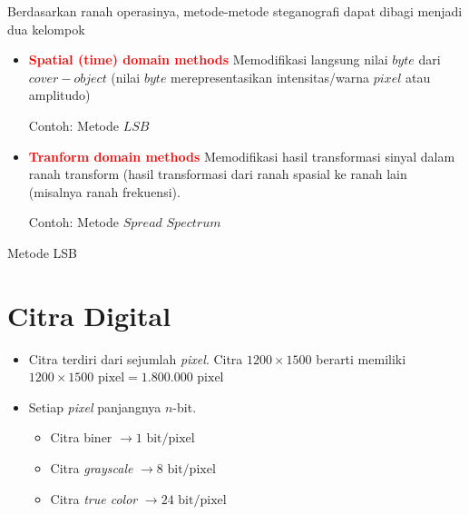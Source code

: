 \documentclass{article}
\begin{document}
Berdasarkan ranah operasinya, metode-metode steganografi dapat dibagi menjadi dua kelompok

\begin{itemize}
    \item \textbf{\textcolor{red}{Spatial (time) domain methods}}
    Memodifikasi langsung nilai $byte$ dari $cover-object$ (nilai $byte$ merepresentasikan intensitas/warna $pixel$ atau amplitudo)
    \par Contoh: Metode $LSB$
    
    \item \textbf{\textcolor{red}{Tranform domain methods}}
    Memodifikasi hasil transformasi sinyal dalam ranah transform (hasil transformasi dari ranah spasial ke ranah lain (misalnya ranah frekuensi).
    \par Contoh: Metode $Spread$ $Spectrum$
\end{itemize}

\newpage


\begin{center}
\huge Metode LSB
\end{center}

\newpage


\section*{Citra Digital}

\vspace{117.91mm}

\begin{itemize}
    \item Citra terdiri dari sejumlah \textit{pixel}. Citra $1200 \times 1500$ berarti memiliki $1200 \times 1500 \text{ pixel} = 1.800.000 \text{ pixel}$
\end{itemize}

\vspace{60mm}

\begin{itemize}
    \item Setiap \textit{pixel} panjangnya $n$-bit.
    \begin{itemize}
        \item Citra biner $\rightarrow 1 \text{ bit/pixel}$
        \item Citra \textit{grayscale} $\rightarrow 8 \text{ bit/pixel}$
        \item Citra \textit{true color} $\rightarrow 24 \text{ bit/pixel}$
    \end{itemize}
\end{itemize}
\end{document}
